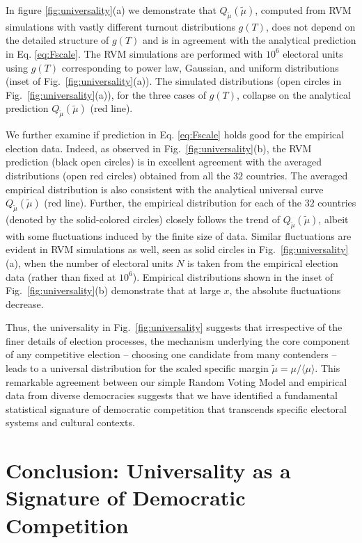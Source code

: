 In figure \ref{fig:universality}(a) we demonstrate that $Q_{\widetilde{\mu}}\left(\widetilde{\mu}\right)$, computed from RVM simulations with vastly different turnout distributions $g(T)$, does not depend on the detailed structure of $g(T)$ and is in agreement with the analytical prediction in Eq. \ref{eq:Fscale}. The RVM simulations are performed with $10^6$ electoral units using $g(T)$ corresponding to power law, Gaussian, and uniform distributions (inset of Fig.~\ref{fig:universality}(a)). The simulated distributions (open circles in Fig.~\ref{fig:universality}(a)), for the three cases of $g(T)$, collapse on the analytical prediction $Q_{\widetilde{\mu}}\left(\widetilde{\mu}\right)$ (red line). 

We further examine if prediction in Eq. \ref{eq:Fscale} holds good for the empirical election data. Indeed, as observed in Fig.~\ref{fig:universality}(b), the RVM prediction (black open circles) is in excellent agreement with the averaged distributions (open red circles) obtained from all the $32$ countries. The averaged empirical distribution is also consistent with the analytical universal curve $Q_{\widetilde{\mu}}\left(\widetilde{\mu}\right)$ (red line). Further, the empirical distribution for each of the $32$ countries (denoted by the solid-colored circles) closely follows the trend of $Q_{\widetilde{\mu}}\left(\widetilde{\mu}\right)$, albeit with some fluctuations induced by the finite size of data. Similar fluctuations are evident in RVM simulations as well, seen as solid circles in Fig.~\ref{fig:universality}(a), when the number of electoral units $N$ is taken from the empirical election data (rather than fixed at $10^6$). Empirical distributions shown in the inset of Fig.~\ref{fig:universality}(b) demonstrate that at large $x$, the absolute fluctuations decrease. 

Thus, the universality in Fig.~\ref{fig:universality} suggests that irrespective of the finer details of election processes, the mechanism underlying the core component of any competitive election -- choosing one candidate from many contenders -- leads to a universal distribution for the scaled specific margin $\widetilde{\mu}=\mu/\langle \mu \rangle$. This remarkable agreement between our simple Random Voting Model and empirical data from diverse democracies suggests that we have identified a fundamental statistical signature of democratic competition that transcends specific electoral systems and cultural contexts. 

\section{Conclusion: Universality as a Signature of Democratic Competition}

